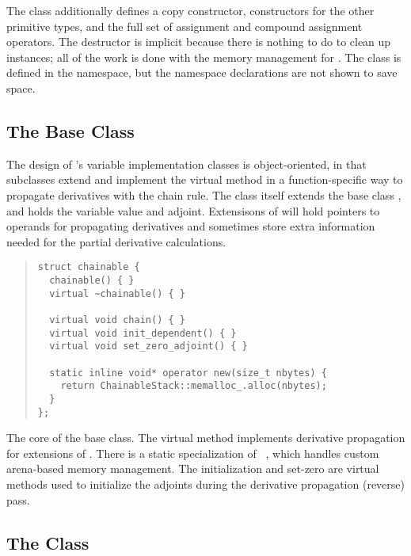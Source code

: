 \documentclass[10pt]{article}
\begin{document}
The  class additionally defines a copy constructor,
constructors for the other primitive types, and the full set of
assignment and compound assignment operators.  The destructor is
implicit because there is nothing to do to clean up instances; all of
the work is done with the memory management for . The class
is defined in the  namespace, but the namespace
declarations are not shown to save
space.

\subsection{The  Base Class}

The design of 's variable implementation classes is
object-oriented, in that subclasses extend  and implement
the virtual method  in a function-specific way to
propagate derivatives with the chain rule.  The class 
itself extends the base class , and holds the variable
value and adjoint.  Extensisons of  will hold pointers to
operands for propagating derivatives and sometimes store extra
information needed for the partial derivative calculations.

\begin{quote}
\begin{Verbatim}
struct chainable {
  chainable() { }
  virtual ~chainable() { }

  virtual void chain() { }
  virtual void init_dependent() { }
  virtual void set_zero_adjoint() { }

  static inline void* operator new(size_t nbytes) {
    return ChainableStack::memalloc_.alloc(nbytes);
  }
};
\end{Verbatim}
\end{quote}
%
The core of the  base class.  The virtual
method  implements derivative propagation for extensions
of .  There is a static specialization of
~, which handles custom arena-based memory
management.  The initialization and set-zero are virtual methods used
to initialize the adjoints during the derivative propagation (reverse)
pass.

\subsection{The  Class}
\end{document}
